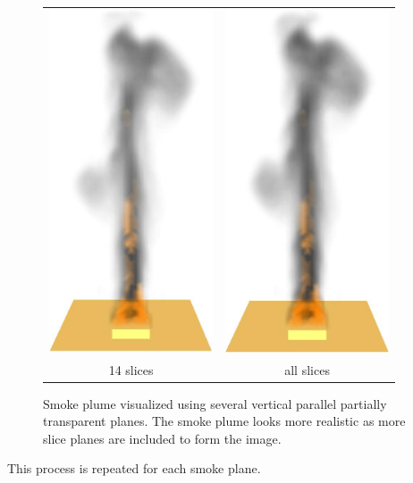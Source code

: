 {\begin{figure}[\figoptions]
\begin{center}
\begin{tabular}{cc}
\includegraphics[height=4.0in]{FIGURES/splume_14_27}&
\includegraphics[height=4.0in]{FIGURES/splume_11_27}\\
14 slices&all slices
\end{tabular}
\end{center}
\caption [Smoke plume visualized using several vertical parallel
partially transparent planes.] {Smoke plume visualized using
several vertical parallel partially transparent planes. The smoke
plume looks more realistic as more slice planes are included to
form the image. } \label{figplume}
\end{figure}

\noindent This process is repeated for each smoke plane.

}
